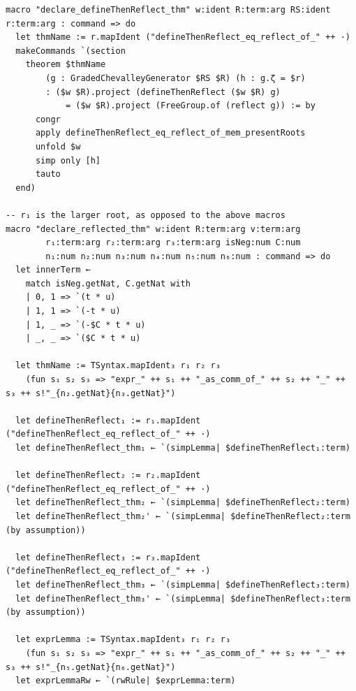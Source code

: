 \begin{Verbatim}
macro "declare_defineThenReflect_thm" w:ident R:term:arg RS:ident r:term:arg : command => do
  let thmName := r.mapIdent ("defineThenReflect_eq_reflect_of_" ++ ·)
  makeCommands `(section
    theorem $thmName
        (g : GradedChevalleyGenerator $RS $R) (h : g.ζ = $r)
        : ($w $R).project (defineThenReflect ($w $R) g)
            = ($w $R).project (FreeGroup.of (reflect g)) := by
      congr
      apply defineThenReflect_eq_reflect_of_mem_presentRoots
      unfold $w
      simp only [h]
      tauto
  end)

-- r₁ is the larger root, as opposed to the above macros
macro "declare_reflected_thm" w:ident R:term:arg v:term:arg
        r₁:term:arg r₂:term:arg r₃:term:arg isNeg:num C:num
        n₁:num n₂:num n₃:num n₄:num n₅:num n₆:num : command => do
  let innerTerm ←
    match isNeg.getNat, C.getNat with
    | 0, 1 => `(t * u)
    | 1, 1 => `(-t * u)
    | 1, _ => `(-$C * t * u)
    | _, _ => `($C * t * u)

  let thmName := TSyntax.mapIdent₃ r₁ r₂ r₃
    (fun s₁ s₂ s₃ => "expr_" ++ s₁ ++ "_as_comm_of_" ++ s₂ ++ "_" ++ s₃ ++ s!"_{n₂.getNat}{n₃.getNat}")

  let defineThenReflect₁ := r₁.mapIdent ("defineThenReflect_eq_reflect_of_" ++ ·)
  let defineThenReflect_thm₁ ← `(simpLemma| $defineThenReflect₁:term)

  let defineThenReflect₂ := r₂.mapIdent ("defineThenReflect_eq_reflect_of_" ++ ·)
  let defineThenReflect_thm₂ ← `(simpLemma| $defineThenReflect₂:term)
  let defineThenReflect_thm₂' ← `(simpLemma| $defineThenReflect₂:term (by assumption))

  let defineThenReflect₃ := r₃.mapIdent ("defineThenReflect_eq_reflect_of_" ++ ·)
  let defineThenReflect_thm₃ ← `(simpLemma| $defineThenReflect₃:term)
  let defineThenReflect_thm₃' ← `(simpLemma| $defineThenReflect₃:term (by assumption))

  let exprLemma := TSyntax.mapIdent₃ r₁ r₂ r₃
    (fun s₁ s₂ s₃ => "expr_" ++ s₁ ++ "_as_comm_of_" ++ s₂ ++ "_" ++ s₃ ++ s!"_{n₅.getNat}{n₆.getNat}")
  let exprLemmaRw ← `(rwRule| $exprLemma:term)


\end{Verbatim}
